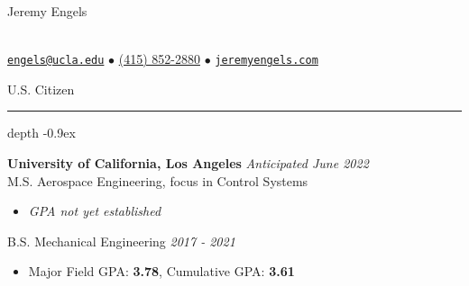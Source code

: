 \documentclass[11pt, letterpaper]{article}
\newcommand\smallspace{3.5pt}
\newcommand\indentlength{0.25in}
\def\Vhrulefill{\leavevmode\leaders\hrule height 1ex depth \dimexpr0.1pt-0.9ex\hfill\kern0pt}
\newenvironment{category}[1]
{
	\vspace{\smallspace}
	\noindent {\LARGE{\sc{#1}}} \hspace{2pt}
	\Vhrulefill
	\vspace{\smallspace}
	\begin{addmargin}[\indentlength]{0in}
}
{
	\end{addmargin}
	\vspace{\smallspace}
}
\newenvironment{experience}[4][3]{
	\vspace{\smallspace}
	\noindent\textbf{#2}
	\hfill \textit{#3} \\
	#4
	\vspace{\smallspace}
	\begin{itemize}
	}
	{
	\end{itemize}
	\vspace{\smallspace}
}
\begin{document}
\begin{center}
\begin{Huge}\begin{sc}Jeremy Engels\end{sc}\end{Huge} \\
\vspace{3pt}
\href{mailto:engels@g.ucla.edu}{\texttt{engels@ucla.edu}} \hspace{0.05in} $\bullet$ \hspace{0.05in} \href{tel:14158522880}{(415) 852-2880}  \hspace{0.05in} $\bullet$ \hspace{0.05in} \href{http://www.jeremyengels.com}{\texttt{jeremyengels.com}}

U.S. Citizen
\end{center}

\vspace{-3pt}
\begin{category}{Education}
\begin{experience}{University of California, Los Angeles}{Anticipated June 2022}{M.S. Aerospace Engineering, focus in Control Systems}
	\item \textit{GPA not yet established}
	\end{itemize}
\vspace{\smallspace}
B.S. Mechanical Engineering \hfill \textit{2017 - 2021}
	\begin{itemize}
		\item Major Field GPA: \textbf{3.78}, Cumulative GPA: \textbf{3.61}
\end{experience}
\end{category}
\end{document}
